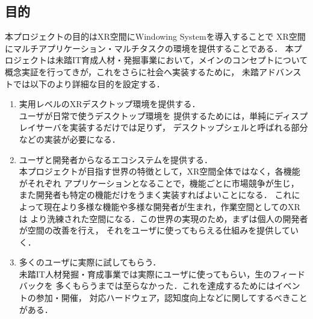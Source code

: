 \subsection{目的}

本プロジェクトの目的はXR空間にWindowing Systemを導入することで
XR空間にマルチアプリケーション・マルチタスクの環境を提供することである．
本プロジェクトは未踏IT育成人材・発掘事業において，メインのコンセプトについて
概念実証を行ってきが，これをさらに社会へ実装するために，
未踏アドバンストでは以下のより詳細な目的を設定する．

\begin{enumerate}
  \item 実用レベルのXRデスクトップ環境を提供する．\\
        ユーザが日常で使うデスクトップ環境を
        提供するためには，単純にディスプレイサーバを実装するだけでは足りず，
        デスクトップシェルと呼ばれる部分などの実装が必要になる．
  \item ユーザと開発者からなるエコシステムを提供する．\\ %
        本プロジェクトが目指す世界の特徴として，XR空間全体ではなく，各機能がそれぞれ
        アプリケーションとなることで，機能ごとに市場競争が生じ，
        また開発者も特定の機能だけをうまく実装すればよいことになる．
        これによって現在より多様な機能や多様な開発者が生まれ，作業空間としてのXRは
        より洗練された空間になる．この世界の実現のため，まずは個人の開発者が空間の改善を行え，
        それをユーザに使ってもらえる仕組みを提供していく．
  \item 多くのユーザに実際に試してもらう．\\
        未踏IT人材発掘・育成事業では実際にユーザに使ってもらい，生のフィードバックを
        多くもらうまでは至らなかった．これを達成するためにはイベントの参加・開催，
        対応ハードウェア，認知度向上などに関してするべきことがある．
\end{enumerate}
